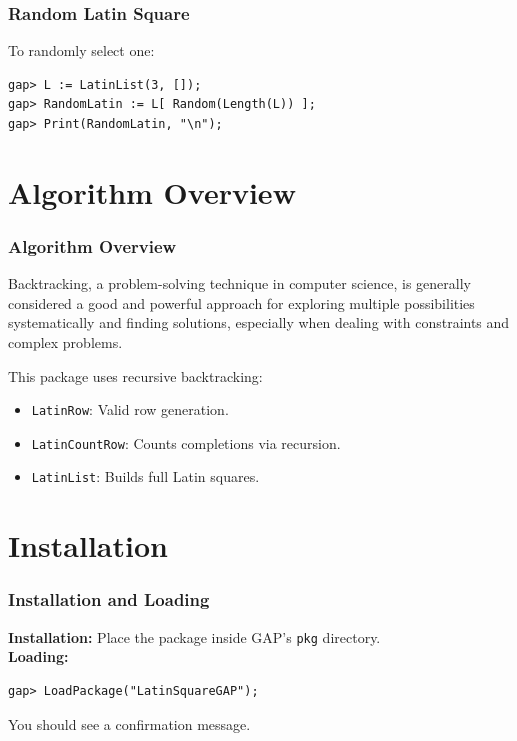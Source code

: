 \documentclass{beamer}
\begin{document}
\begin{frame}[fragile]
\frametitle{Random Latin Square}
To randomly select one:
\begin{lstlisting}
gap> L := LatinList(3, []);
gap> RandomLatin := L[ Random(Length(L)) ];
gap> Print(RandomLatin, "\n");
\end{lstlisting}
\end{frame}

\section{Algorithm Overview}
\begin{frame}
\frametitle{Algorithm Overview}

Backtracking, a problem-solving technique in computer science, is generally considered a good and powerful approach for exploring multiple possibilities systematically and finding solutions, especially when dealing with constraints and complex problems. 

This package uses recursive backtracking:
\begin{itemize}
  \item \texttt{LatinRow}: Valid row generation.
  \item \texttt{LatinCountRow}: Counts completions via recursion.
  \item \texttt{LatinList}: Builds full Latin squares.
\end{itemize}
\end{frame}

\section{Installation}
\begin{frame}[fragile]
\frametitle{Installation and Loading}
\textbf{Installation:}  
Place the package inside GAP's \texttt{pkg} directory.\\
\textbf{Loading:}
\begin{lstlisting}
gap> LoadPackage("LatinSquareGAP");
\end{lstlisting}
You should see a confirmation message.
\end{frame}

\end{document}
